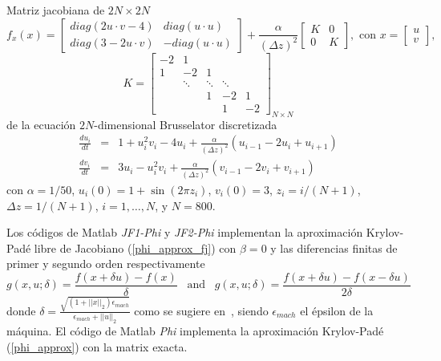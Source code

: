 \begin{example}
	\label{ej:ej1-hpfj} Matriz jacobiana de $2N\times2N$
	\begin{equation*}
	f_{x}(x)=\left[ 
	\begin{array}{cc}
	diag(2u\cdot v-4) & diag(u\cdot u) \\ 
	diag(3-2u\cdot v) & -diag(u\cdot u)%
	\end{array}%
	\right] +\frac{\alpha }{(\Delta z)^{2}}\left[ 
	\begin{array}{cc}
	K & 0 \\ 
	0 & K%
	\end{array}%
	\right] ,\text{ \ \ \ con \ \ \ \ }x=\left[ 
	\begin{array}{c}
	u \\ 
	v%
	\end{array}%
	\right] ,
	\end{equation*}
	\[
	K=\left[ 
	\begin{array}{ccccc}
	-2 & 1 &  &  & \\
	1 & -2 & 1 &  &  \\
	& \ddots  & \ddots  & \ddots  &  \\
	&  & 1 & -2 & 1 \\
	&  &  & 1 & -2%
	\end{array}%
	\right]_{N\times N}
	\]
	de la  ecuación $2N$-dimensional Brusselator discretizada
	\begin{eqnarray*}
		\frac{du_{i}}{dt} &=&1+u_{i}^{2}v_{i}-4u_{i}+\frac{\alpha }{(\Delta z)^{2}}%
		(u_{i-1}-2u_{i}+u_{i+1}) \\
		\frac{dv_{i}}{dt} &=&3u_{i}-u_{i}^{2}v_{i}+\frac{\alpha }{(\Delta z)^{2}}%
		(v_{i-1}-2v_{i}+v_{i+1})
	\end{eqnarray*}
	con $\alpha =1/50$, $u_{i}(0)=1+\sin (2\pi z_{i})$, $v_{i}(0)=3$, $z_{i}=i/(N+1)$, $\Delta z =1/(N+1)$, $i=1,\ldots,N$, y $N=800$.
\end{example}

Los códigos de Matlab \textit{JF1-Phi} y \textit{JF2-Phi} implementan la aproximación Krylov-Padé libre de Jacobiano (\ref{phi_approx_fj}) con $\beta=0$ y las diferencias finitas de primer y segundo orden respectivamente
\begin{equation}\label{finite-differences}
	g(x,u;\delta)=\frac{f(x+\delta u)-f(x)}{\delta}  \;\;\; \text{and} \;\;\; g(x,u;\delta)=\frac{f(x+\delta u)-f(x-\delta u)}{2\delta}
\end{equation}
donde $\delta= \frac{\sqrt{(1+||x||_2)\epsilon_{mach}}}{\epsilon_{mach}+||u||_2}$ como se sugiere en~\cite{knoll2004jacobian}, siendo $\epsilon_{mach}$ el épsilon de la máquina. El código de Matlab \textit{Phi} implementa la aproximación Krylov-Padé (\ref{phi_approx}) con la matrix exacta.

